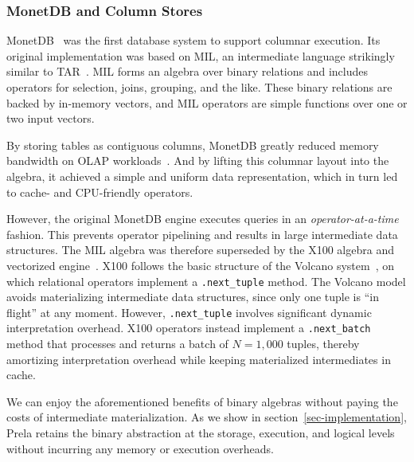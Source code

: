 \documentclass[sigconf,screen,pbalance]{cidr-2027}
\newcommand{\noun}[1]{\textsf{#1}}
\newcommand{\code}{\lstinline[style=prela]}
\begin{document}
\subsubsection*{MonetDB and Column Stores}
MonetDB~\cite{bonczMonetDBX100HyperPipelining2005} was the first database system to support columnar execution.
Its original implementation was based on MIL, an intermediate language strikingly similar to \noun{TAR}~\cite{bonczMILPrimitivesQuerying1999}.
MIL forms an algebra over binary relations and includes operators for selection, joins, grouping, and the like.
These binary relations are backed by in-memory vectors, and MIL operators are simple functions over one or two input vectors.

By storing tables as contiguous columns, MonetDB greatly reduced memory bandwidth on OLAP workloads~\cite{manegoldOptimizingDatabaseArchitecture2000}.
And by lifting this columnar layout into the algebra, it achieved a simple and uniform data representation, which in turn led to cache- and CPU-friendly operators.

However, the original MonetDB engine executes queries in an \emph{operator-at-a-time} fashion.
This prevents operator pipelining and results in large intermediate data structures.
The MIL algebra was therefore superseded by the X100 algebra and vectorized engine~\cite{DBLP:conf/cidr/BonczZN05}.
X100 follows the basic structure of the Volcano system~\cite{DBLP:journals/tkde/Graefe94}, on which relational operators implement a \code|.next_tuple| method.
The Volcano model avoids materializing intermediate data structures, since only one tuple is ``in flight'' at any moment.
However, \code|.next_tuple| involves significant dynamic interpretation overhead.
X100 operators instead implement a \code|.next_batch| method that processes and returns a batch of $N = 1{,}000$ tuples, thereby amortizing interpretation overhead while keeping materialized intermediates in cache.

We can enjoy the aforementioned benefits of binary algebras without paying the costs of intermediate materialization.
As we show in section~\ref{sec-implementation}, Prela retains the binary abstraction at the storage, execution, and logical levels without incurring any memory or execution overheads.
\end{document}
